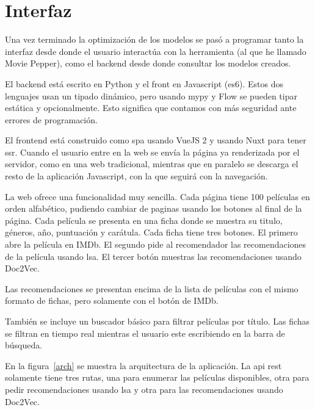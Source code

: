\documentclass[withindex, glossary]{cam-thesis}
\begin{document}
\chapter{Interfaz}
Una vez terminado la optimización de los modelos se pasó a programar tanto la interfaz desde donde el usuario interactúa con la herramienta (al que he llamado Movie Pepper), como el backend desde donde consultar los modelos creados.

El backend está escrito en Python y el front en Javascript (\acrshort{es6}). Estos dos lenguajes usan un tipado dinámico, pero usando mypy y Flow se pueden tipar estática y opcionalmente. Esto significa que contamos con más seguridad ante errores de programación.

El frontend está construido como \acrshort{spa} usando VueJS 2 y usando Nuxt para tener \acrshort{ssr}. Cuando el usuario entre en la web se envía la página ya renderizada por el servidor, como en una web tradicional, mientras que en paralelo se descarga el resto de la aplicación Javascript, con la que seguirá con la navegación.

La web ofrece una funcionalidad muy sencilla. Cada página tiene 100 películas en orden alfabético, pudiendo cambiar de paginas usando los botones al final de la página. Cada película se presenta en una ficha donde se muestra su titulo, géneros, año, puntuación y carátula. Cada ficha tiene tres botones. El primero abre la película en IMDb. El segundo pide al recomendador las recomendaciones de la película usando \acrshort{lsa}. El tercer botón muestras las recomendaciones usando Doc2Vec.

Las recomendaciones se presentan encima de la lista de películas con el mismo formato de fichas, pero solamente con el botón de IMDb.

También se incluye un buscador básico para filtrar películas por título. Las fichas se filtran en tiempo real mientras el usuario este escribiendo en la barra de búsqueda.

En la figura~\ref{arch} se muestra la arquitectura de la aplicación. La \acrshort{api} \acrshort{rest} solamente tiene tres rutas, una para enumerar las películas disponibles, otra para pedir recomendaciones usando \acrshort{lsa} y otra para las recomendaciones usando Doc2Vec.
\end{document}
